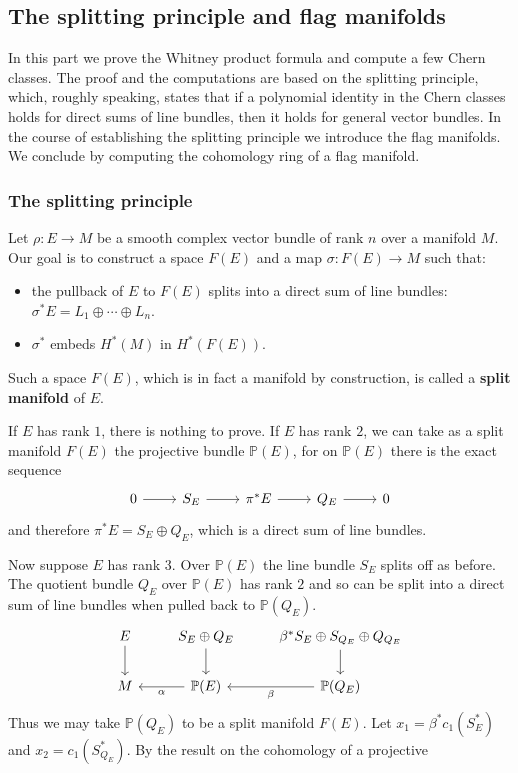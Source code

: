 \subsection{The splitting principle and flag manifolds}
In this part we prove the Whitney product formula and compute a few Chern classes. The proof and the computations are based on the splitting principle, which, roughly 
speaking, states that if a polynomial identity in the Chern classes holds for direct sums of line bundles, then it holds for general vector bundles. In the course of 
establishing the splitting principle we introduce the flag manifolds. We conclude by computing the cohomology ring of a flag manifold.
\subsubsection{The splitting principle}
Let $\rho:E\to M$ be a smooth complex vector bundle of rank $n$ over a manifold $M$. Our goal is to construct a space $F(E)$ and a map $\sigma:F(E)\to M$ such that:
\begin{itemize}
\item the pullback of $E$ to $F(E)$ splits into a direct sum of line bundles: $\sigma^*E=L_1\oplus\cdots\oplus L_n$.
\item $\sigma^*$ embeds $H^*(M)$ in $H^*(F(E))$.
\end{itemize}
Such a space $F(E)$, which is in fact a manifold by construction, is called a \textbf{split manifold} of $E$.\par
If $E$ has rank $1$, there is nothing to prove. If $E$ has rank $2$, we can take as a split manifold $F(E)$ the projective bundle $\mathbb{P}(E)$, for on $\mathbb{P}(E)$ 
there is the exact sequence
\[\begin{tikzcd}
0\ar[r]&S_E\ar[r]&\pi^*E\ar[r]&Q_E\ar[r]&0
\end{tikzcd}\]
and therefore $\pi^*E=S_E\oplus Q_E$, which is a direct sum of line bundles.\par
Now suppose $E$ has rank $3$. Over $\mathbb{P}(E)$ the line bundle $S_E$ splits off as before. The quotient bundle $Q_E$ over $\mathbb{P}(E)$ has rank $2$ and so can be 
split into a direct sum of line bundles when pulled back to $\mathbb{P}(Q_E)$.
\[\begin{tikzcd}
E\ar[d]&S_E\oplus Q_E\ar[d]&\beta^*S_E\oplus S_{Q_E}\oplus Q_{Q_E}\ar[d]\\
M&\mathbb{P}(E)\ar[l,"\alpha"]&\mathbb{P}(Q_E)\ar[l,"\beta"]
\end{tikzcd}\]
Thus we may take $\mathbb{P}(Q_E)$ to be a split manifold $F(E)$. Let $x_1=\beta^*c_1(S_E^*)$ and $x_2=c_1(S_{Q_E}^*)$. By the result on the cohomology of a projective 
